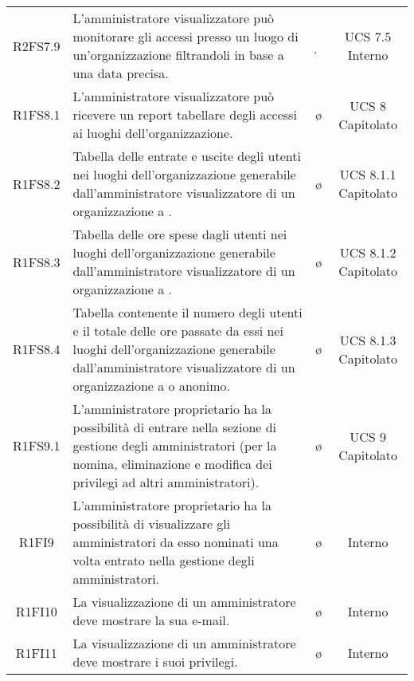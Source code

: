 {\begin{longtable}{ c C{6.5cm} c c}
R2FS7.9 & L'amministratore visualizzatore può monitorare gli accessi presso un luogo di un'organizzazione filtrandoli in base a una data precisa. & \d & UCS 7.5 Interno\\

R1FS8.1 & L'amministratore visualizzatore può ricevere un report tabellare degli accessi ai luoghi dell'organizzazione. & \o & UCS 8 Capitolato\\

R1FS8.2 &  Tabella delle entrate e uscite degli utenti nei luoghi dell'organizzazione generabile dall'amministratore visualizzatore di un organizzazione a . & \o & UCS 8.1.1 Capitolato\\

R1FS8.3 & Tabella delle ore spese dagli utenti nei luoghi dell'organizzazione generabile dall'amministratore visualizzatore di un organizzazione a . & \o & UCS 8.1.2 Capitolato\\

R1FS8.4 & Tabella contenente il numero degli utenti e il totale delle ore passate da essi nei luoghi dell'organizzazione generabile dall'amministratore visualizzatore di un organizzazione a  o anonimo. & \o & UCS 8.1.3 Capitolato\\




R1FS9.1 & L'amministratore proprietario ha la possibilità di entrare nella sezione di gestione degli amministratori (per la nomina, eliminazione e modifica dei privilegi ad altri amministratori). & \o & UCS 9 Capitolato \\

R1FI9 & L'amministratore proprietario ha la possibilità di visualizzare gli amministratori da esso nominati una volta entrato nella gestione degli amministratori. & \o & Interno \\

R1FI10 & La visualizzazione di un amministratore deve mostrare la sua e-mail. & \o & Interno \\

R1FI11 & La visualizzazione di un amministratore deve mostrare i suoi privilegi. & \o & Interno \\


\end{longtable}}
